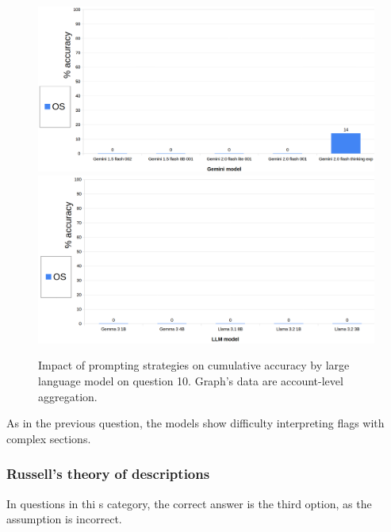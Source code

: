 \documentclass[12pt]{article}
\begin{document}
\begin{figure}[H]
    \centering
            \includegraphics[width=1\textwidth]{q204Gemini.png}
            \includegraphics[width=1\textwidth]{q204Other.png}
    \caption[Accuracy on Question 10 by LLM]{Impact of prompting strategies on cumulative accuracy by large language model on question 10. Graph's data are account-level aggregation.}
    \end{figure} 
As in the previous question, the models show difficulty interpreting flags with complex sections.\\

\vspace{2cm}
\subsubsection{Russell's theory of descriptions} %
In questions in thi
s category, the correct answer is the third option, as the assumption is incorrect.\\

\end{document}

